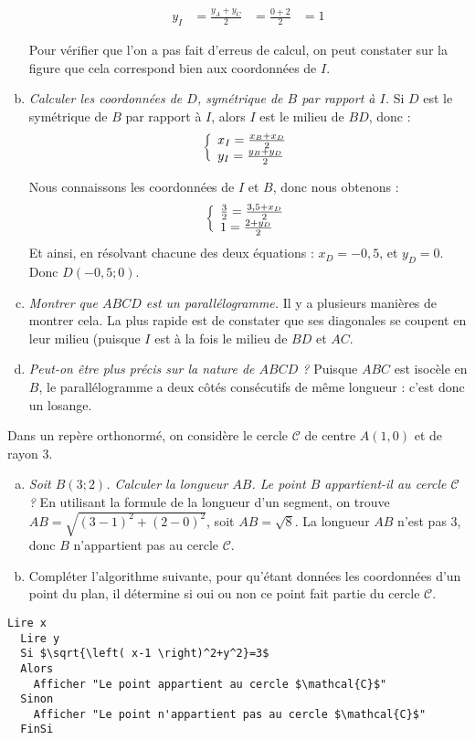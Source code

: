 \documentclass[12pt]{article}
\begin{document}
\begin{exercice}
\begin{enumerate}[(a)]
\begin{multicols}{2}
    \begin{align*}
      y_I&=\frac{y_A+y_C}{2}
         &=\frac{0+2}{2}
         &=1
    \end{align*}
  \end{multicols}
  Pour vérifier que l'on a pas fait d'erreus de calcul, on peut constater sur la figure que cela correspond bien aux coordonnées de $I$.
  \item \emph{Calculer les coordonnées de $D$, symétrique de $B$ par rapport à $I$.}
    Si $D$ est le symétrique de $B$ par rapport à $I$, alors $I$ est le milieu de $BD$, donc :
    \[\left\{\begin{array}{l}
      x_I=\frac{x_B+x_D}{2}
    \\
      y_I=\frac{y_B+y_D}{2}
    \end{array}\right.\]

    Nous connaissons les coordonnées de $I$ et $B$, donc nous obtenons :
    \[\left\{\begin{array}{l}
      \frac{3}{2}=\frac{3,5+x_D}{2}
    \\
      1=\frac{2+y_D}{2}
    \end{array}\right.\]
    Et ainsi, en résolvant chacune des deux équations : $x_D=-0,5$, et $y_D=0$. Donc $D(-0,5;0)$.
  \item \emph{Montrer que $ABCD$ est un parallélogramme.}
    Il y a plusieurs manières de montrer cela. La plus rapide est de constater que ses diagonales se coupent en leur milieu (puisque $I$ est à la fois le milieu de $BD$ et $AC$.
  \item \emph{Peut-on être plus précis sur la nature de $ABCD$ ?}
    Puisque $ABC$ est isocèle en $B$, le parallélogramme a deux côtés consécutifs de même longueur : c'est donc un losange.
\end{enumerate}
\end{exercice}

\begin{exercice}
  Dans un repère orthonormé, on considère le cercle $\mathcal{C}$ de centre $A(1, 0)$ et de rayon 3.
  \begin{enumerate}[(a)]
    \item \emph{Soit $B(3;2)$. Calculer la longueur $AB$. Le point $B$ appartient-il au cercle $\mathcal{C}$ ?} En utilisant la formule de la longueur d'un segment, on trouve $AB=\sqrt{\left( 3-1 \right)^2+\left( 2-0 \right)^2}$, soit $AB=\sqrt{8}$. La longueur $AB$ n'est pas 3, donc $B$ n'appartient pas au cercle $\mathcal{C}$.
    \item Compléter l'algorithme suivante, pour qu'étant données les coordonnées d'un point du plan, il détermine si oui ou non ce point fait partie du cercle $\mathcal{C}$.
  \end{enumerate}

  \begin{lstlisting}[language=naturel,frame=lines,mathescape=true]
  Lire x
  Lire y
  Si $\sqrt{\left( x-1 \right)^2+y^2}=3$
  Alors
    Afficher "Le point appartient au cercle $\mathcal{C}$"
  Sinon
    Afficher "Le point n'appartient pas au cercle $\mathcal{C}$"
  FinSi
  \end{lstlisting}

\end{exercice}
\end{document}
